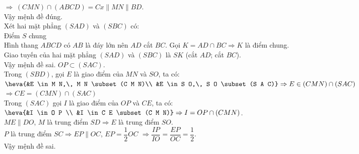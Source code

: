\begin{ex}
{\begin{itemchoice}
   $\Rightarrow ~(CMN)\cap  (ABCD)=Cx\parallel MN\parallel BD$.\\
   Vậy mệnh  đề đúng.\\
   \itemch Xét hai mặt phẳng $\left(SAD\right)$ và $\left(SBC\right)$  có:\\
   Điểm $S$  chung\\
   Hình thang $ABCD$ có $AB$ là đáy lớn nên $AD$  cắt $BC$. Gọi $K=AD\cap BC\Rightarrow K$ là điểm chung.\\
   Giao  tuyến của hai mặt phẳng $\left(SAD\right)$ và $\left(SBC\right)$ là $SK$ (cắt $AD$; cắt $BC$).\\
   Vậy mệnh đề sai. 
   \itemch $O P  \subset(S A C)$.\\
   Trong $(S B D)$, gọi $E$ là giao điểm của  $M N$ và $S O$, ta có:\\
   $\heva{&E \in M  N,\, M N \subset(C M N)\\
   &E \in S O,\, S O  \subset(S A C)}\Rightarrow E \in(C M N) \cap(S A C)$\\
   $\Rightarrow C E=(C M N) \cap(S A  C)$\\
   Trong $(S A C)$ gọi $I$ là giao điểm của $O P$ và $C E$, ta  có:\\
   $\heva{&I \in  O P \\
   &I \in C E \subset(C  M N)}
   \Rightarrow I=O P \cap(C M N)$.\\ 
   $M E \parallel D O$, $M$ là trung điểm  $S D \Rightarrow E$ là trung điểm $S O$.\\
   $P$ là trung điểm $S C  \Rightarrow E P \parallel O C$, $E P=\dfrac{1}{2} O C$
   $\Rightarrow \dfrac{I P}{I O}=\dfrac{E P}{O C}=\dfrac{1}{2}$.\\ 
   Vậy  mệnh đề sai.
  \end{itemchoice}
  }
\end{ex}

